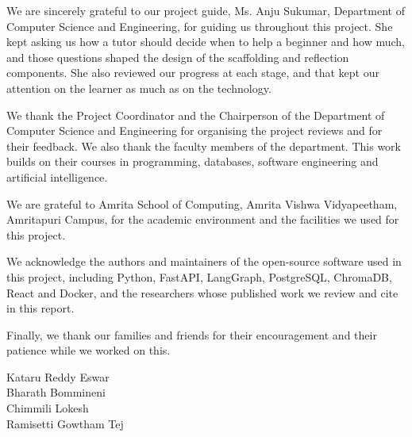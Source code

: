 We are sincerely grateful to our project guide, Ms. Anju Sukumar, Department of Computer Science and Engineering, for guiding us throughout this project. She kept asking us how a tutor should decide when to help a beginner and how much, and those questions shaped the design of the scaffolding and reflection components. She also reviewed our progress at each stage, and that kept our attention on the learner as much as on the technology.

We thank the Project Coordinator and the Chairperson of the Department of Computer Science and Engineering for organising the project reviews and for their feedback. We also thank the faculty members of the department. This work builds on their courses in programming, databases, software engineering and artificial intelligence.

We are grateful to Amrita School of Computing, Amrita Vishwa Vidyapeetham, Amritapuri Campus, for the academic environment and the facilities we used for this project.

We acknowledge the authors and maintainers of the open-source software used in this project, including Python, FastAPI, LangGraph, PostgreSQL, ChromaDB, React and Docker, and the researchers whose published work we review and cite in this report.

Finally, we thank our families and friends for their encouragement and their patience while we worked on this.

\vspace{1cm}
\begin{flushright}
Kataru Reddy Eswar\\
Bharath Bommineni\\
Chimmili Lokesh\\
Ramisetti Gowtham Tej
\end{flushright}
